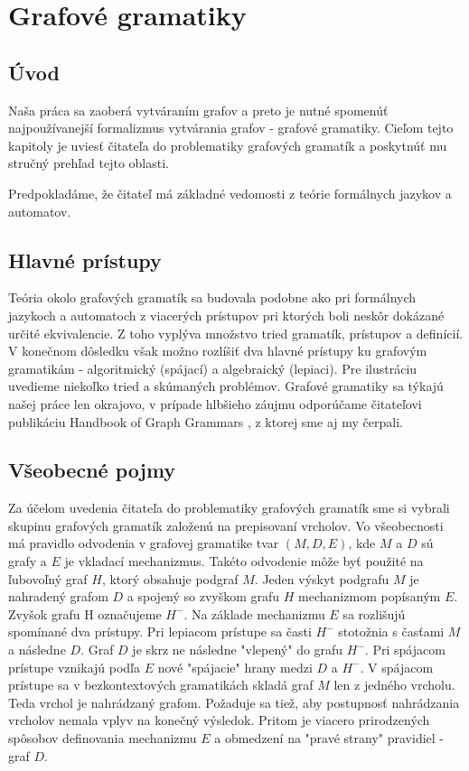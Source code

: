 
\chapter{Grafové gramatiky}%
\thispagestyle{empty}
\section{Úvod}
Naša práca sa zaoberá vytváraním grafov a preto je nutné spomenúť 
najpoužívanejší formalizmus vytvárania grafov - grafové gramatiky.
Cieľom tejto kapitoly je uviesť čitateľa do problematiky grafových 
gramatík a poskytnúť mu stručný prehľad tejto oblasti.

Predpokladáme, že čitateľ má základné vedomosti z teórie formálnych 
jazykov a automatov.

\section{Hlavné prístupy}
Teória okolo grafových gramatík sa budovala podobne ako pri formálnych
jazykoch a automatoch z viacerých prístupov pri ktorých boli neskôr dokázané
určité ekvivalencie. Z toho vyplýva množstvo tried gramatík, prístupov a
definícií.
V konečnom dôsledku však možno rozlíšiť dva hlavné prístupy ku grafovým
gramatikám - algoritmický (spájací) a algebraický (lepiaci).
Pre ilustráciu uvedieme niekoľko tried a skúmaných problémov.
Grafové gramatiky sa týkajú našej práce len okrajovo, v prípade hlbšieho 
záujmu odporúčame čitateľovi publikáciu Handbook of Graph Grammars \cite{GG} ,
z ktorej sme aj my čerpali.

\section{Všeobecné pojmy}
Za účelom uvedenia čitateľa do problematiky grafových gramatík sme si
vybrali skupinu grafových gramatík založenú na prepisovaní vrcholov. Vo
všeobecnosti má pravidlo odvodenia v grafovej gramatike tvar $(M, D, E)$,
kde $M$ a $D$ sú grafy a $E$ je vkladací mechanizmus. Takéto odvodenie môže
byť použité na ľubovoľný graf $H$, ktorý obsahuje podgraf $M$. Jeden výskyt
podgrafu $M$ je nahradený grafom $D$ a spojený so zvyškom grafu $H$
mechanizmom popísaným $E$. Zvyšok grafu H označujeme $H^{-}$.
Na základe mechanizmu $E$ sa rozlišujú spomínané dva prístupy. Pri lepiacom
prístupe sa časti $H^{-}$ stotožnia s časťami $M$ a následne $D$. Graf $D$
je skrz ne následne "vlepený" do grafu $H^{-}$.
Pri spájacom prístupe vznikajú podľa $E$ nové "spájacie" hrany medzi $D$ a 
$H^{-}$.
V spájacom prístupe sa v bezkontextových gramatikách skladá graf $M$ len z
jedného vrcholu. Teda vrchol je nahrádzaný grafom. Požaduje sa tiež, aby
postupnosť nahrádzania vrcholov nemala vplyv na konečný výsledok. Pritom je
viacero prirodzených spôsobov definovania mechanizmu $E$ a obmedzení na
"pravé strany" pravidiel - graf $D$.



